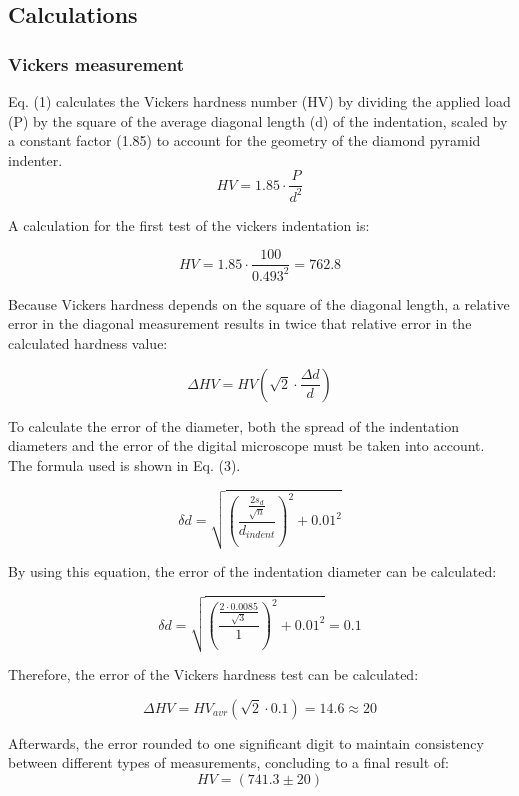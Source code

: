 \documentclass[a4paper]{article}
\begin{document}
\subsection{Calculations}
\subsubsection{Vickers measurement}
Eq. (1) calculates the Vickers hardness number (HV) by dividing the applied load
(P) by the square of the average diagonal length (d) of the indentation, scaled
by a constant factor (1.85) to account for the geometry of the diamond pyramid
indenter\cite{LoeckxHardness}.
\begin{equation}
  HV = 1.85 \cdot \frac{P}{d^2}
\end{equation}

A calculation for the first test of the vickers indentation is:

\[HV = 1.85 \cdot \frac{100}{0.493^2} = 762.8\]

Because Vickers hardness depends on the square of the diagonal length, a
relative error in the diagonal measurement results in twice that relative error
in the calculated hardness value\cite{LoeckxHardness}:

\begin{equation}
  \Delta HV = HV(\sqrt{2} \cdot \frac{\Delta d}{d})
\end{equation}


To calculate the error of the diameter, both the spread of the indentation
diameters and the error of the digital microscope must be taken into account\cite{LoeckxHardness}.
The formula used is shown in Eq. (3).

\begin{equation}
  \delta d = \sqrt{\left( \frac{\frac{2 s_d}{\sqrt{n}}}{d_{indent}} \right )^2 + 0.01^2}
\end{equation}

By using this equation, the error of the indentation diameter can be calculated:

\[ \delta d = \sqrt{\left( \frac{\frac{2 \cdot 0.0085
}{\sqrt{3}}}{1} \right )^2 + 0.01^2} = 0.1 \]


Therefore, the error of the Vickers hardness test can be calculated:    
      
\[ \Delta HV = HV_{avr} (\sqrt{2}\cdot 0.1) = 14.6  \approx 20\]

Afterwards, the error rounded to one significant digit to maintain consistency
between different types of measurements\cite{DeneyerUncertainty}, concluding to
a final result of:
\[HV = (741.3 \pm 20)\]
\end{document}
